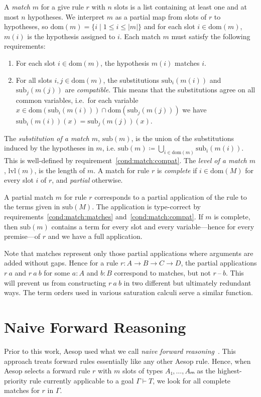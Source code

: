 \documentclass[runningheads,leqno]{llncs}
\newcommand{\dom}{\ensuremath{\mathrm{dom}}}
\newcommand{\sub}{\ensuremath{\mathrm{sub}}}
\newcommand{\lvl}{\ensuremath{\mathrm{lvl}}}
\begin{document}
A \textit{match} $m$ for a give rule $r$ with $n$ slots is a list containing at least one and at most $n$ hypotheses.
We interpret $m$ as a partial map from slots of $r$ to hypotheses, so $\dom(m) = \{i \mid 1 ≤ i ≤ |m| \}$ and for each slot $i ∈ \dom(m)$, $m(i)$ is the hypothesis assigned to $i$.
Each match $m$ must satisfy the following requirements:
\begin{enumerate}
  \item\label{cond:match:matches} For each slot $i ∈ \dom(m)$, the hypothesis $m(i)$ matches $i$.
  \item\label{cond:match:compat} For all slots $i,j ∈ \dom(m)$, the substitutions $\sub_{i}(m(i))$ and $\sub_{j}(m(j))$ are \emph{compatible}.
        This means that the substitutions agree on all common variables, i.e.\ for each variable $x ∈ \dom(\sub_{i}(m(i))) ∩ \dom(\sub_{j}(m(j)))$ we have $\sub_{i}(m(i))(x) = \sub_{j}(m(j))(x)$.
\end{enumerate}
The \emph{substitution of a match $m$}, $\sub(m)$, is the union of the substitutions induced by the hypotheses in $m$, i.e. $\sub(m) ≔ ⋃_{i ∈ \dom(m)}\sub_{i}(m(i))$.
This is well-defined by requirement~\ref{cond:match:compat}.
The \textit{level of a match $m$}, $\lvl(m)$, is the length of $m$.
A match for rule $r$ is \textit{complete} if $i ∈ \dom(M)$ for every slot $i$ of $r$, and \emph{partial} otherwise.

A partial match $m$ for rule $r$ corresponds to a partial application of the rule to the terms given in $\sub(M)$.
The application is type-correct by requirements~\ref{cond:match:matches} and~\ref{cond:match:compat}.
If $m$ is complete, then $\sub(m)$ contains a term for every slot and every variable---hence for every premise---of $r$ and we have a full application.

Note that matches represent only those partial applications where arguments are added without gaps.
Hence for a rule $r : A → B → C → D$, the partial applications $r~a$ and $r~a~b$ for some $a : A$ and $b : B$ correspond to matches, but not $r~\text{--}~b$.
This will prevent us from constructing $r~a~b$ in two different but ultimately redundant ways.
The term orders used in various saturation calculi serve a similar function.

\section{Naive Forward Reasoning}%
\label{sec:naive}

Prior to this work, Aesop used what we call \emph{naive forward reasoning}~\cite{Aesop}.
This approach treats forward rules essentially like any other Aesop rule.
Hence, when Aesop selects a forward rule $r$ with $m$ slots of types $A₁, \dots, Aₘ$ as the highest-priority rule currently applicable to a goal $Γ ⊢ T$, we look for all complete matches for $r$ in $Γ$.
\end{document}
